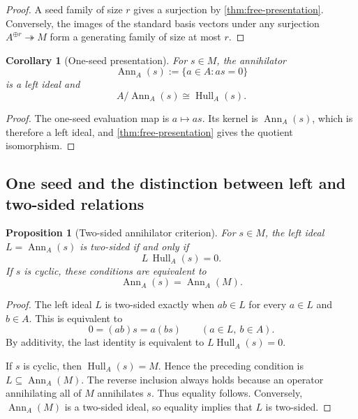 \documentclass[11pt]{article}
\newtheorem{proposition}[proposition]{Proposition}
\newtheorem{corollary}[corollary]{Corollary}
\theoremstyle{definition}
\theoremstyle{remark}
\theoremstyle{definition}\newtheorem{example}[theorem]{Example}
\newcommand{\Hull}{\operatorname{Hull}}
\newcommand{\RecordID}[1]{\label{record:#1}}
\newcommand{\Depends}[1]{}
\begin{document}
\begin{proof}
A seed family of size $r$ gives a surjection by \cref{thm:free-presentation}.  Conversely, the images of the standard basis vectors under any surjection $A^{\oplus r}\twoheadrightarrow M$ form a generating family of size at most $r$.
\end{proof}

\begin{corollary}[One-seed presentation]
\label{cor:one-seed-presentation}
For $s\in M$, the annihilator
\[
\operatorname{Ann}_A(s):=\{a\in A:as=0\}
\]
is a left ideal and
\[
\boxed{A/\operatorname{Ann}_A(s)\cong\Hull_A(s).}
\]
\end{corollary}
\RecordID{PSC-I-C-ONE-SEED-PRESENTATION}
\Depends{PSC-I-T-FREE-PRESENTATION.}

\begin{proof}
The one-seed evaluation map is $a\mapsto as$.  Its kernel is $\operatorname{Ann}_A(s)$, which is therefore a left ideal, and \cref{thm:free-presentation} gives the quotient isomorphism.
\end{proof}

\subsection{One seed and the distinction between left and two-sided relations}
\begin{proposition}[Two-sided annihilator criterion]
\label{prop:two-sided-annihilator}
For $s\in M$, the left ideal $L=\operatorname{Ann}_A(s)$ is two-sided if and only if
\[
L\,\Hull_A(s)=0.
\]
If $s$ is cyclic, these conditions are equivalent to
\[
\operatorname{Ann}_A(s)=\operatorname{Ann}_A(M).
\]
\end{proposition}
\RecordID{PSC-I-P-ANNIHILATOR-TWO-SIDED}
\Depends{PSC-I-C-ONE-SEED-PRESENTATION.}

\begin{proof}
The left ideal $L$ is two-sided exactly when $ab\in L$ for every $a\in L$ and $b\in A$.  This is equivalent to
\[
0=(ab)s=a(bs)
\qquad(a\in L,\ b\in A).
\]
By additivity, the last identity is equivalent to $L\Hull_A(s)=0$.

If $s$ is cyclic, then $\Hull_A(s)=M$.  Hence the preceding condition is $L\subseteq\operatorname{Ann}_A(M)$.  The reverse inclusion always holds because an operator annihilating all of $M$ annihilates $s$.  Thus equality follows.  Conversely, $\operatorname{Ann}_A(M)$ is a two-sided ideal, so equality implies that $L$ is two-sided.
\end{proof}
\end{document}
